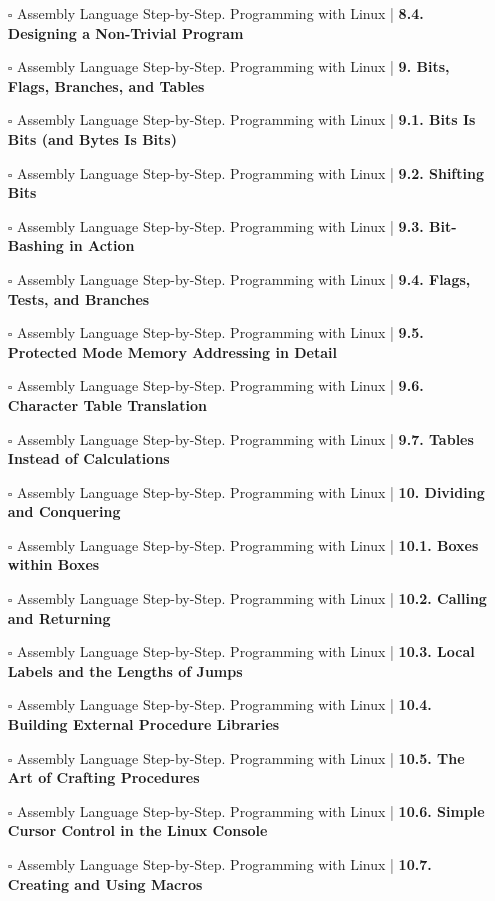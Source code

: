 \documentclass[a4, landscape, 12pt]{article}
\newcommand{\checkbox}{$\square$}%
\begin{document}
\begin{itemize}
{}
\item [\checkbox]  Assembly Language Step-by-Step. Programming with Linux | \textbf{ 8.4. Designing a Non-Trivial Program
}
\item [\checkbox]  Assembly Language Step-by-Step. Programming with Linux | \textbf{ 9. Bits, Flags, Branches, and Tables
}
\item [\checkbox]  Assembly Language Step-by-Step. Programming with Linux | \textbf{ 9.1. Bits Is Bits (and Bytes Is Bits)
}
\item [\checkbox]  Assembly Language Step-by-Step. Programming with Linux | \textbf{ 9.2. Shifting Bits
}
\item [\checkbox]  Assembly Language Step-by-Step. Programming with Linux | \textbf{ 9.3. Bit-Bashing in Action
}
\item [\checkbox]  Assembly Language Step-by-Step. Programming with Linux | \textbf{ 9.4. Flags, Tests, and Branches
}
\item [\checkbox]  Assembly Language Step-by-Step. Programming with Linux | \textbf{ 9.5. Protected Mode Memory Addressing in Detail
}
\item [\checkbox]  Assembly Language Step-by-Step. Programming with Linux | \textbf{ 9.6. Character Table Translation
}
\item [\checkbox]  Assembly Language Step-by-Step. Programming with Linux | \textbf{ 9.7. Tables Instead of Calculations
}
\item [\checkbox]  Assembly Language Step-by-Step. Programming with Linux | \textbf{ 10. Dividing and Conquering
}
\item [\checkbox]  Assembly Language Step-by-Step. Programming with Linux | \textbf{ 10.1. Boxes within Boxes
}
\item [\checkbox]  Assembly Language Step-by-Step. Programming with Linux | \textbf{ 10.2. Calling and Returning
}
\item [\checkbox]  Assembly Language Step-by-Step. Programming with Linux | \textbf{ 10.3. Local Labels and the Lengths of Jumps
}
\item [\checkbox]  Assembly Language Step-by-Step. Programming with Linux | \textbf{ 10.4. Building External Procedure Libraries
}
\item [\checkbox]  Assembly Language Step-by-Step. Programming with Linux | \textbf{ 10.5. The Art of Crafting Procedures
}
\item [\checkbox]  Assembly Language Step-by-Step. Programming with Linux | \textbf{ 10.6. Simple Cursor Control in the Linux Console
}
\item [\checkbox]  Assembly Language Step-by-Step. Programming with Linux | \textbf{ 10.7. Creating and Using Macros
}
\end{itemize}
\end{document}
